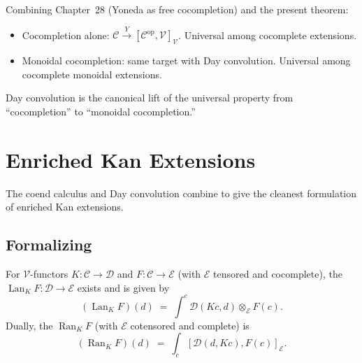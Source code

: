 \begin{remark}
Combining Chapter~28 (Yoneda as free cocompletion) and the present theorem:
\begin{itemize}
  \item Cocompletion alone: $\mathcal{C} \xrightarrow{Y} [\mathcal{C}^{\mathrm{op}},
        \mathcal{V}]_\mathcal{V}$. Universal among cocomplete extensions.
  \item Monoidal cocompletion: same target with Day convolution. Universal
        among cocomplete monoidal extensions.
\end{itemize}
Day convolution is the canonical lift of the universal property from
``cocompletion'' to ``monoidal cocompletion.''
\end{remark}


\section{Enriched Kan Extensions}
\label{sec:enriched-kan-via-day}

The coend calculus and Day convolution combine to give the cleanest
formulation of enriched Kan extensions.

\subsection{Formalizing}

\begin{theorem}
\label{thm:enriched-kan}
For $\mathcal{V}$-functors $K : \mathcal{C} \to \mathcal{D}$ and $F :
\mathcal{C} \to \mathcal{E}$ (with $\mathcal{E}$ tensored and cocomplete),
the  $\operatorname{Lan}_K F : \mathcal{D}
\to \mathcal{E}$ exists and is given by
\begin{equation*}
  (\operatorname{Lan}_K F)(d) \;=\; \int^c \mathcal{D}(K c, d) \otimes_\mathcal{E} F(c).
\end{equation*}
Dually, the  $\operatorname{Ran}_K F$
(with $\mathcal{E}$ cotensored and complete) is
\begin{equation*}
  (\operatorname{Ran}_K F)(d) \;=\; \int_c [\mathcal{D}(d, K c), F(c)]_\mathcal{E}.
\end{equation*}
\end{theorem}

